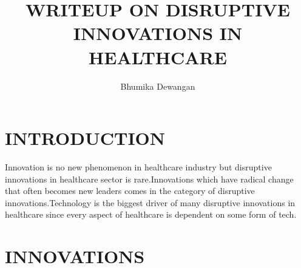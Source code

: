 \documentclass[12 pt]{article}
\title{WRITEUP ON DISRUPTIVE INNOVATIONS IN HEALTHCARE}
\author{Bhumika Dewangan}
\date{}
\begin{document}
\maketitle
\section{INTRODUCTION}
Innovation is no new phenomenon in healthcare industry but disruptive innovations in healthcare sector is rare.Innovations which have radical change that often becomes new leaders comes in the category of disruptive innovations.Technology is the biggest driver of many disruptive innovations in healthcare since every aspect of healthcare is dependent on some form of tech. 
\section{INNOVATIONS}
\end{document}
